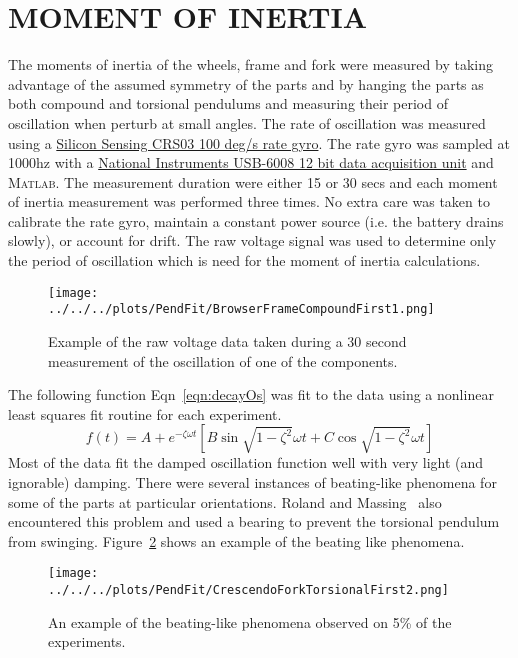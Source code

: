 \documentclass{bmd2010p}
\begin{document}
\section{MOMENT OF INERTIA}
\label{sec:moi}
The moments of inertia of the wheels, frame and fork were measured by taking
advantage of the assumed symmetry of the parts and by hanging the parts as both
compound and torsional pendulums and measuring their period of oscillation when
perturb at small angles. The rate of oscillation was measured
using a \href{http://www.siliconsensing.com/CRS03}{Silicon Sensing CRS03 100
deg/s rate gyro}. The rate gyro was sampled at
1000hz with a
\href{http://sine.ni.com/nips/cds/view/p/lang/en/nid/14604}{National
Instruments USB-6008 12 bit data acquisition unit} and
\textsc{Matlab}. The measurement duration were either 15 or 30 secs and each moment of
inertia measurement was performed three times. No extra care was taken to
calibrate the rate gyro, maintain a constant power source (i.e. the battery
drains slowly), or account for drift. The raw voltage signal was used to
determine only the period of oscillation which is need for the moment of inertia
calculations.
\begin{figure}[tbp]
    \begin{center}
        \texttt{[image: ../../../plots/PendFit/BrowserFrameCompoundFirst1.png]}
    \end{center}
    \caption{Example of the raw voltage data taken during a 30 second
    measurement of the oscillation of one of the components.}
    \label{fig:voltage}
\end{figure}
The following function Eqn~\ref{eqn:decayOs} was fit to the data using a nonlinear least squares fit
routine for each experiment.
\begin{equation}
    f(t) = A + e^{-\zeta\omega t}\left[B\sin{\sqrt{1-\zeta^2}\omega t} +
    C\cos{\sqrt{1-\zeta^2}\omega t}\right]
    \label{eqn:decayOs}
\end{equation}
Most of the data fit the damped oscillation function well with very light (and
ignorable) damping. There were several instances of beating-like phenomena for
some of the parts at particular orientations. Roland and
Massing~\cite{Roland1971} also encountered this problem and used a bearing to
prevent the torsional pendulum from swinging. Figure~\ref{fig:beating} shows an
example of the beating like phenomena.
\begin{figure}[tpb]
    \begin{center}
        \texttt{[image: ../../../plots/PendFit/CrescendoForkTorsionalFirst2.png]}
    \end{center}
    \caption{An example of the beating-like phenomena observed on 5\% of the
    experiments.}
    \label{fig:beating}
\end{figure}
\end{document}
